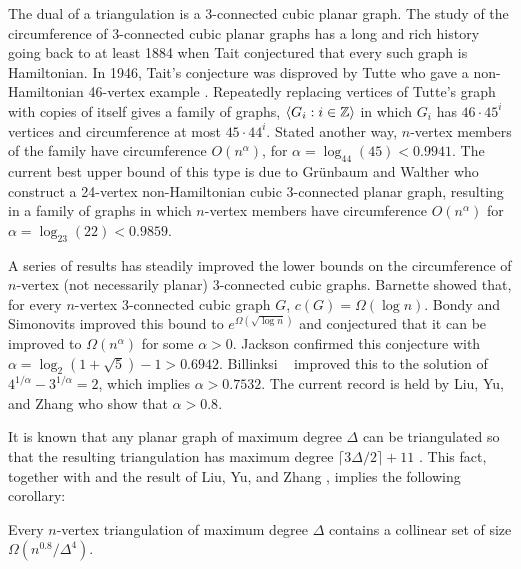 \documentclass{patmorin}
\newcommand{\note}[2]{{\color{red}[#1:~#2]}}
\begin{document}
The dual of a triangulation is a 3-connected cubic planar graph.
The study of the circumference of 3-connected cubic planar graphs
has a long and rich history going back to at least 1884 when Tait
\cite{tait:remarks} conjectured that every such graph is Hamiltonian.  In
1946, Tait's conjecture was disproved by Tutte who gave a non-Hamiltonian
46-vertex example \cite{tutte:on}.  Repeatedly replacing vertices of
Tutte's graph with copies of itself gives a family of graphs, $\langle G_i:i\in
\mathbb{Z}\rangle$ in which $G_i$ has $46\cdot 45^i$ vertices and circumference at
most $45\cdot44^i$.  Stated another way, $n$-vertex members of the
family have circumference $O(n^\alpha)$, for $\alpha=\log_{44}(45) < 0.9941$.
The current best upper bound of this type is due to Gr\"unbaum and
Walther \cite{grunbaum.walther:shortness} who construct a 24-vertex
non-Hamiltonian cubic 3-connected planar graph, resulting in a family
of graphs in which $n$-vertex members have circumference $O(n^{\alpha})$
for $\alpha=\log_{23}(22)< 0.9859$.

A series of results has steadily improved the lower bounds on the
circumference of $n$-vertex  (not necessarily planar) 3-connected
cubic graphs.  Barnette \cite{barnette:trees} showed that, for
every $n$-vertex 3-connected cubic graph $G$, $c(G)=\Omega(\log n)$.
Bondy and Simonovits \cite{bondy.simonovits:longest} improved this bound
to $e^{\Omega(\sqrt{\log n})}$ and conjectured that it can be improved
to $\Omega(n^\alpha)$ for some $\alpha>0$.  Jackson \cite{jackson:longest}
confirmed this conjecture with $\alpha=\log_2(1+\sqrt{5})-1 > 0.6942$.
Billinksi \etal\ \cite{bilinksi.jackson.ea:circumference} improved
this to the solution of $4^{1/\alpha}-3^{1/\alpha}=2$, which implies
$\alpha>0.7532$.  The current record is held by Liu, Yu, and Zhang
\cite{liu.yu.zhang:circumference} who show that $\alpha>0.8$.  

It is known that any planar graph of maximum degree $\Delta$ can be
triangulated so that the resulting triangulation has maximum degree
$\lceil 3\Delta/2\rceil+11$ \cite{kant.bodlaender:triangulating}. This
fact, together with  and the result of Liu, Yu, and Zhang
\cite{liu.yu.zhang:circumference}, implies the following corollary:

\begin{cor}
  Every $n$-vertex triangulation of maximum degree $\Delta$ contains a
  collinear set of size $\Omega(n^{0.8}/\Delta^4)$.
\end{cor}

\end{document}
